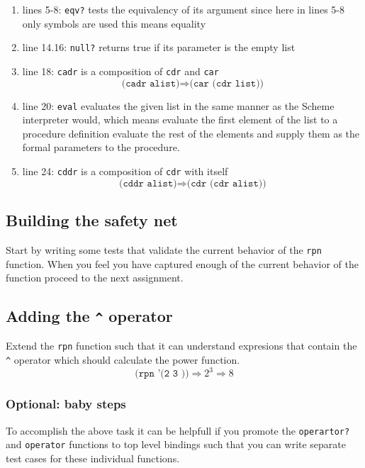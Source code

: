 \documentclass[12pt,a4paper,english,twoside]{article}
\begin{document}
\begin{enumerate}
  \item lines 5-8: \texttt{eqv?} tests the equivalency of its argument since here in lines 
    5-8 only symbols are used this means equality
  \item line 14.16: \texttt{null?} returns true if its parameter is the empty list
  \item line 18: \texttt{cadr} is a composition of \texttt{cdr} and \texttt{car} 
    \begin{equation*}
      \texttt{(cadr alist)} \Rightarrow \texttt{(car (cdr list))}
    \end{equation*}
  \item line 20: \texttt{eval} evaluates the given list in the same manner as the 
    Scheme interpreter would, which means evaluate the first element of the 
    list to a procedure definition evaluate the rest of the elements and 
    supply them as the formal parameters to the procedure.
  \item line 24: \texttt{cddr} is a composition of \texttt{cdr} with itself
    \begin{equation*}
      \texttt{(cddr alist)} \Rightarrow \texttt{(cdr (cdr alist))}
    \end{equation*}
\end{enumerate}
\subsection{Building the safety net}
Start by writing some tests that validate the current behavior of the 
\texttt{rpn} function. When you feel you have captured enough of the current 
behavior of the function proceed to the next assignment.
\subsection{Adding the \texttt{\^{}} operator}
Extend the \texttt{rpn} function such that it can understand expresions that 
contain the \texttt{\^{}} operator which should calculate the power function.  
\begin{equation*}
\texttt{(rpn '(2 3 \^{}))} \Rightarrow 2^{3} \Rightarrow 8 
\end{equation*}

\subsubsection{Optional: baby steps}
To accomplish the above task it can be helpfull if you promote the 
\texttt{operartor?} and \texttt{operator} functions to top level bindings such 
that you can write separate test cases for these individual functions.
\end{document}
